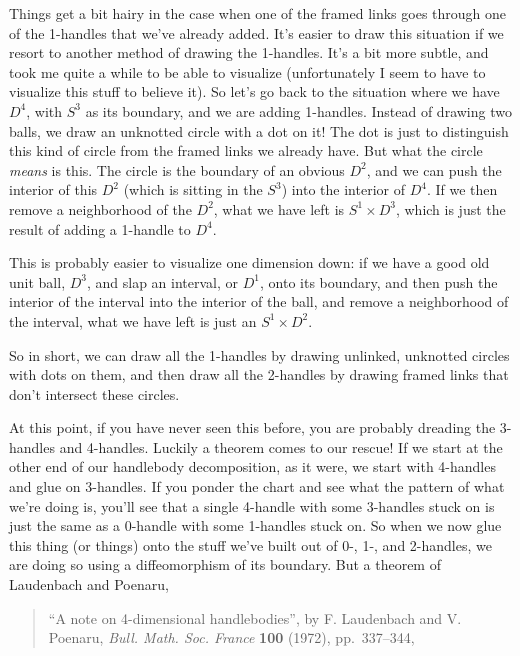 \documentclass{article}
\begin{document}
Things get a bit hairy in the case when one of the framed links goes
through one of the 1-handles that we've already added. It's easier to
draw this situation if we resort to another method of drawing the
1-handles. It's a bit more subtle, and took me quite a while to be able
to visualize (unfortunately I seem to have to visualize this stuff to
believe it). So let's go back to the situation where we have \(D^4\),
with \(S^3\) as its boundary, and we are adding 1-handles. Instead of
drawing two balls, we draw an unknotted circle with a dot on it! The dot
is just to distinguish this kind of circle from the framed links we
already have. But what the circle \emph{means} is this. The circle is
the boundary of an obvious \(D^2\), and we can push the interior of this
\(D^2\) (which is sitting in the \(S^3\)) into the interior of \(D^4\).
If we then remove a neighborhood of the \(D^2\), what we have left is
\(S^1 \times D^3\), which is just the result of adding a 1-handle to
\(D^4\).

This is probably easier to visualize one dimension down: if we have a
good old unit ball, \(D^3\), and slap an interval, or \(D^1\), onto its
boundary, and then push the interior of the interval into the interior
of the ball, and remove a neighborhood of the interval, what we have
left is just an \(S^1 \times D^2\).

So in short, we can draw all the 1-handles by drawing unlinked,
unknotted circles with dots on them, and then draw all the 2-handles by
drawing framed links that don't intersect these circles.

At this point, if you have never seen this before, you are probably
dreading the 3-handles and 4-handles. Luckily a theorem comes to our
rescue! If we start at the other end of our handlebody decomposition, as
it were, we start with 4-handles and glue on 3-handles. If you ponder
the chart and see what the pattern of what we're doing is, you'll see
that a single 4-handle with some 3-handles stuck on is just the same as
a 0-handle with some 1-handles stuck on. So when we now glue this thing
(or things) onto the stuff we've built out of 0-, 1-, and 2-handles, we
are doing so using a diffeomorphism of its boundary. But a theorem of
Laudenbach and Poenaru,

\begin{quote}
``A note on 4-dimensional handlebodies'', by F. Laudenbach and V.
Poenaru, \emph{Bull. Math. Soc. France} \textbf{100} (1972),
pp.~337--344,
\end{quote}
\end{document}
